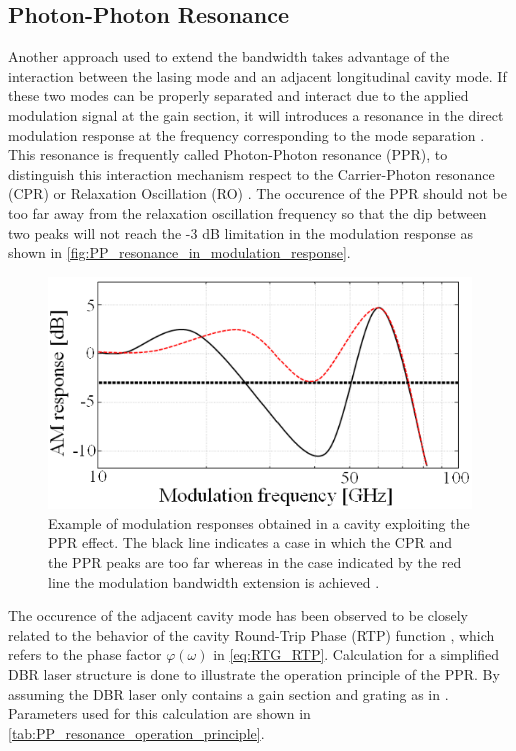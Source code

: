 \subsection{Photon-Photon Resonance}\label{subsec:pp_resonance}
Another approach used to extend the bandwidth takes advantage of the interaction between the lasing mode and an adjacent longitudinal cavity mode. If these two modes can be properly separated and interact due to the applied modulation signal at the gain section, it will introduces a resonance in the direct modulation response at the frequency corresponding to the mode separation \cite{montrosset2014laser}. This resonance is frequently called Photon-Photon resonance (PPR), to distinguish this interaction mechanism respect to the Carrier-Photon resonance (CPR) or Relaxation Oscillation (RO) \cite{montrosset2014laser}. The occurence of the PPR should not be too far away from the relaxation oscillation frequency so that the dip between two peaks will not reach the -3 dB limitation in the modulation response as shown in \autoref{fig:PP_resonance_in_modulation_response}.

\begin{figure}[H]
    \centering
    \includegraphics[width=.6\linewidth]{figures/PP_resonance_in_modulation_response.png}
    \caption{Example of modulation responses obtained in a cavity exploiting the PPR effect. The black line indicates a case in which the CPR and the PPR peaks are too far whereas in the case indicated by the red line the modulation bandwidth extension is achieved \cite{montrosset2014laser}.}
    \label{fig:PP_resonance_in_modulation_response}
\end{figure}

The occurence of the adjacent cavity mode has been observed to be closely related to the behavior of the cavity Round-Trip Phase (RTP) function \cite{reithmaier2005modulation}, which refers to the phase factor $\varphi(\omega)$ in \autoref{eq:RTG_RTP}. Calculation for a simplified DBR laser structure is done to illustrate the operation principle of the PPR. By assuming the DBR laser only contains a gain section and grating as in \cite{montrosset2014laser}. Parameters used for this calculation are shown in \autoref{tab:PP_resonance_operation_principle}.

